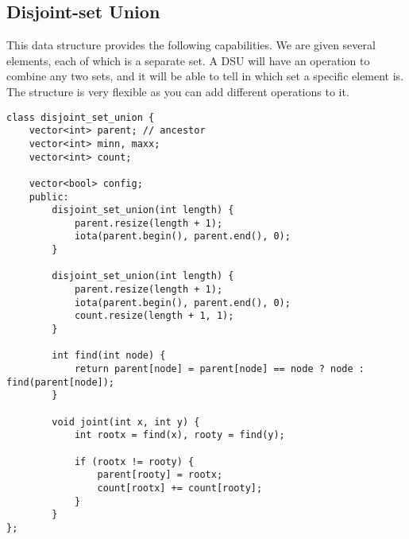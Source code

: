 \subsection{Disjoint-set Union}
This data structure provides the following capabilities. 
We are given several elements, each of which is a separate set. 
A DSU will have an operation to combine any two sets, 
and it will be able to tell in which set a specific element is. 
The structure is very flexible as you can add different operations to it.
\begin{lstlisting}
class disjoint_set_union {
    vector<int> parent; // ancestor
    vector<int> minn, maxx;
    vector<int> count;
    
    vector<bool> config;
    public:
        disjoint_set_union(int length) {
            parent.resize(length + 1);
            iota(parent.begin(), parent.end(), 0);
        }
        
        disjoint_set_union(int length) {
            parent.resize(length + 1);
            iota(parent.begin(), parent.end(), 0);
            count.resize(length + 1, 1);
        }
        
        int find(int node) {
            return parent[node] = parent[node] == node ? node : find(parent[node]);
        }
        
        void joint(int x, int y) {
            int rootx = find(x), rooty = find(y);

            if (rootx != rooty) {
                parent[rooty] = rootx;
                count[rootx] += count[rooty];
            }
        }
};
\end{lstlisting}